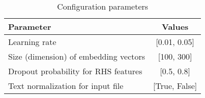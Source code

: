 \begin{table}[!hb]
    \centering
    \caption{Configuration parameters}
    \label{tab:hyperparameter}
    \begin{tabular}{|l|c|}
        \hline
        \textbf{Parameter} & \textbf{Values} \\
        \hline
        Learning rate & [0.01, 0.05] \\
        \hline
        Size (dimension) of embedding vectors & [100, 300] \\
        \hline
        Dropout probability for RHS features & [0.5, 0.8] \\
        \hline
        Text normalization for input file & [True, False]\\
        \hline
    \end{tabular}
\end{table}


